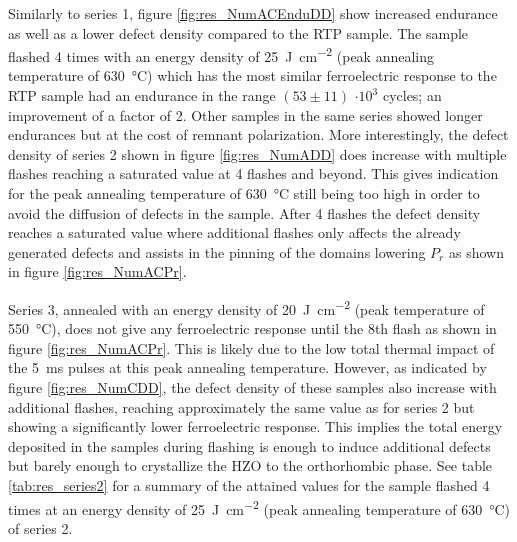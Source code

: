 \documentclass[11pt,twoside,final]{eitExjobb}  %
\begin{document}
Similarly to series 1, figure \ref{fig:res_NumACEnduDD} show increased
endurance as well as a lower defect density compared to the RTP sample. The
sample flashed 4 times with an energy density of
\SI{25}{\joule\per\centi\meter\squared} (peak annealing temperature of
\SI{630}{\celsius}) which has the most similar ferroelectric
response to the RTP sample had an endurance in the range $(53 \pm 11)$ $\cdot
10^3$ cycles; an improvement of a factor of 2. Other samples in the same series
showed longer endurances but at the cost of remnant polarization. More
interestingly, the defect density of series 2 shown in figure
\ref{fig:res_NumADD} does increase with multiple flashes reaching a saturated
value at 4 flashes and beyond. This gives indication for the peak annealing
temperature of \SI{630}{\celsius} still being too high in order to avoid the
diffusion of defects in the sample. After 4 flashes the defect density reaches
a saturated value where additional flashes only affects the already generated
defects and assists in the pinning of the domains lowering $P_r$ as shown in
figure \ref{fig:res_NumACPr}.

Series 3, annealed with an energy density of
\SI{20}{\joule\per\centi\meter\squared} (peak temperature of
\SI{550}{\celsius}), does not give any ferroelectric response until the 8th
flash as shown in figure \ref{fig:res_NumACPr}. This is likely due to the low
total thermal impact of the \SI{5}{\milli\second} pulses at this peak annealing
temperature. However, as indicated by figure \ref{fig:res_NumCDD}, the defect
density of these samples also increase with additional flashes, reaching
approximately the same value as for series 2 but showing a significantly
lower ferroelectric response. This implies the total energy deposited in the
samples during flashing is enough to induce additional defects but barely
enough to crystallize the HZO to the orthorhombic phase. See table
\ref{tab:res_series2} for a summary of the attained values for the sample
flashed 4 times at an energy density of \SI{25}{\joule\per\centi\meter\squared}
(peak annealing temperature of \SI{630}{\celsius}) of series 2.
\end{document}
